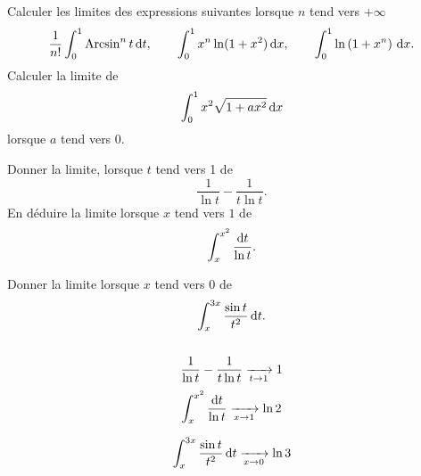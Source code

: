 \documentclass{magnolia}
\begin{document}




\begin{questions}
\question Calculer les limites des expressions suivantes lorsque $n$ tend vers
  $+\infty$
  \[\frac{1}{n!} \int_{0}^{1} \operatorname{Arcsin}^n t\,\text{d}t, \qquad
    \int_{0}^{1} x^n\ln(1+x^2)\,\text{d}x, \qquad \int_{0}^{1} \ln\left(1+x^n\right)\,\text{d}x.\]
\question Calculer la limite de
  \[\int_{0}^{1} x^2\sqrt{1+ax^2}\,\text{d}x\]
  lorsque $a$ tend vers $0$.
\end{questions}

\begin{questions}
\question
  \begin{questions}
  \question Donner la limite, lorsque $t$ tend vers 1 de
    \[\frac{1}{\ln t}-\frac{1}{t\ln t}.\]
  \question En déduire la limite lorsque $x$ tend vers $1$ de
    \[\int_{x}^{x^2} \frac{\text{d}t}{\ln t}.\]
  \end{questions}
\question Donner la limite lorsque $x$ tend vers $0$ de
  \[\int_{x}^{3x} \frac{\sin t}{t^2}\,\text{d}t.\]
\end{questions}
\begin{sol}
$\quad$
\begin{questions}
\question
  \begin{questions}
  \question 
    \[\frac{1}{\ln t}-\frac{1}{t\ln t}\xrightarrow[t\rightarrow 1]{}1\]
  \question 
    \[\int_{x}^{x^2} \frac{\text{d}t}{\ln t}\xrightarrow[x\rightarrow 1]{}\ln 2\]    
  \end{questions}
\question 
  \[\int_{x}^{3x} \frac{\sin t}{t^2}\,\text{d}t\xrightarrow[x\rightarrow 0]{}\ln 3\]
\end{questions}
\end{sol}
\end{document}
